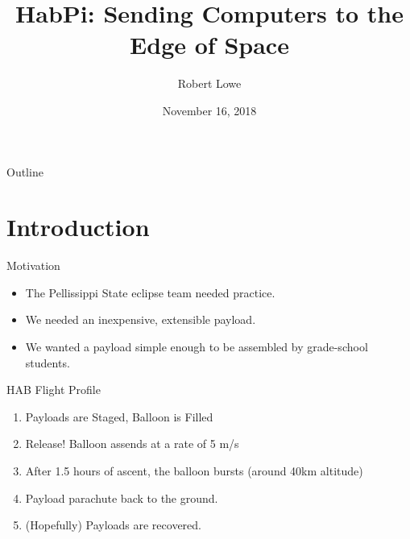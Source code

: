 \documentclass[handout]{beamer}
\title{HabPi: Sending Computers to the Edge of Space}
\author{Robert Lowe\\}
\institute[Maryville College] %
{
  Division of Mathematics and Computer Science\\
  Maryville College
}
\date[]{November 16, 2018}
\begin{document}
\begin{frame}
  \titlepage
\end{frame}

\begin{frame}{Outline}
  \tableofcontents
\end{frame}




\section{Introduction}
\begin{frame}{Motivation}
	\begin{itemize}
	\item The Pellissippi State eclipse team needed practice.
	\item We needed an inexpensive, extensible payload.
	\item We wanted a payload simple enough to be assembled by grade-school students.
	\end{itemize}
\end{frame}

\begin{frame}{HAB Flight Profile}
    \begin{enumerate}
        \item Payloads are Staged, Balloon is Filled
        \item Release!  Balloon assends at a rate of 5 m/s
        \item After 1.5 hours of ascent, the balloon bursts (around 40km altitude)
        \item Payload parachute back to the ground.
        \item (Hopefully) Payloads are recovered.
    \end{enumerate}
\end{frame}
\end{document}
